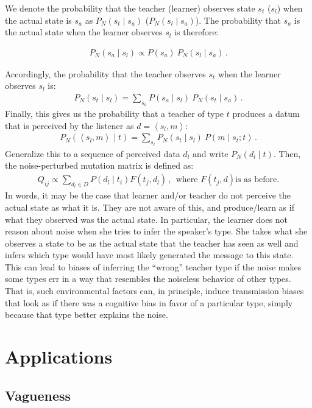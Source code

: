 \documentclass[11pt]{article}
\newcommand{\tuple}[1]{\ensuremath{\left\langle #1 \right\rangle}}
\begin{document}
We denote the probability that the teacher (learner) observes state $s_t$ ($s_l$) when the actual state is $s_a$ as $P_N(s_t \mid s_a)$ ($P_N(s_l \mid s_a)$). The probability that $s_a$ is the actual state when the learner observes $s_l$ is therefore:

\begin{align*}
  P_N(s_a \mid s_l) \propto P(s_a) \ P_N(s_l \mid s_a)\,.
\end{align*}

Accordingly, the probability that the teacher observes $s_t$ when the learner observes $s_l$ is:
\begin{align*}
  P_N(s_t \mid s_l) = \sum_{s_a} P(s_a \mid s_l) \ P_N(s_t \mid s_a)\,.
\end{align*}
Finally, this gives us the probability that a teacher of type $t$ produces a datum that is
perceived by the listener as $d = \tuple{s_l, m}$:
\begin{align*}
  P_N(\tuple{s_l, m} \mid t) = \sum_{s_t} P_N(s_t \mid s_l) \ P(m \mid s_t; t)\,.
\end{align*}
Generalize this to a sequence of perceived data $d_l$ and write $P_N(d_l \mid t)$. Then, the noise-perturbed mutation matrix is defined as:
\begin{align*}
  Q_{ij}  \propto \sum_{d_l \in D} P(d_l \mid t_i) F(t_j,d_l) \,, \ \  \text{where $F(t_j,d)$
    is as before.}
\end{align*}
In words, it may be the case that learner and/or teacher do not perceive the actual state as what it is. They are not aware of this, and produce/learn as if what they observed was the actual state. In particular, the learner does not reason about noise when she tries to infer the speaker's type. She takes what she observes a state to be as the actual state that the teacher has seen as well and infers which type would have most likely generated the message to this state. This can lead to biases of inferring the ``wrong'' teacher type if the noise makes some types err in a way that resembles the noiseless behavior of other types. That is, such environmental factors can, in principle, induce transmission biases that look as if there was a cognitive bias in favor of a particular type, simply because that type better explains the noise.

\section{Applications}
\subsection{Vagueness}
\end{document}
